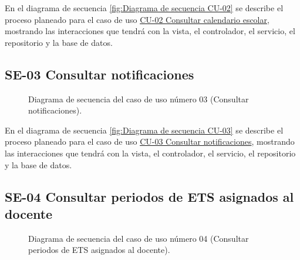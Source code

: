En el diagrama de secuencia \ref{fig:Diagrama de secuencia CU-02} se describe el proceso planeado para el caso de uso \hyperlink{CU-02}{CU-02 Consultar calendario escolar}, mostrando las interacciones que tendrá con la vista, el controlador, el servicio, el repositorio y la base de datos.

\newpage

\subsection{SE-03 Consultar notificaciones}

\begin{figure}[htbp!]
	\begin{center}
		\caption{Diagrama de secuencia del caso de uso número 03 (Consultar notificaciones).}
		\label{fig:Diagrama se secuencia CU-03}
	\end{center}
\end{figure}

En el diagrama de secuencia \ref{fig:Diagrama de secuencia CU-03} se describe el proceso planeado para el caso de uso \hyperlink{CU-03}{CU-03 Consultar notificaciones}, mostrando las interacciones que tendrá con la vista, el controlador, el servicio, el repositorio y la base de datos.

\newpage

\subsection{SE-04 Consultar periodos de ETS asignados al docente}

\begin{figure}[htbp!]
	\begin{center}
		\caption{Diagrama de secuencia del caso de uso número 04 (Consultar periodos de ETS asignados al docente).}
		\label{fig:Diagrama de secuencia CU-04}
	\end{center}
\end{figure}


